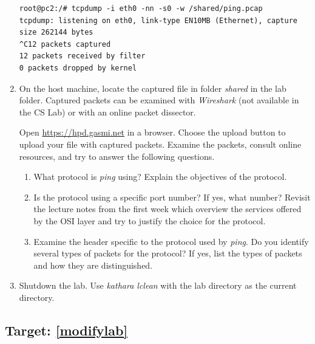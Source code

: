 \documentclass[12pt]{book}
\begin{document}
\begin{enumerate}[resume*]
  \medskip
  \begin{lstlisting}
root@pc2:/# tcpdump -i eth0 -nn -s0 -w /shared/ping.pcap
tcpdump: listening on eth0, link-type EN10MB (Ethernet), capture size 262144 bytes
^C12 packets captured
12 packets received by filter
0 packets dropped by kernel
  \end{lstlisting}

\item\label{icmp} On the host machine, locate the captured file in folder \emph{shared} in the lab folder. Captured packets can be examined with \emph{Wireshark} (not available in the CS Lab) or with an online packet dissector.

  Open \url{https://hpd.gasmi.net} in a browser. Choose the upload button to upload your file with captured packets. Examine the packets, consult online resources, and try to answer the following questions.
  \begin{enumerate}[label=\roman*)]
  \item What protocol is \emph{ping} using? Explain the objectives of the protocol.
  \item Is the protocol using a specific port number? If yes, what number? Revisit the lecture notes from the first week which overview the services offered by the OSI layer and try to justify the choice for the protocol.
  \item Examine the header specific to the protocol used by \emph{ping}. Do you identify several types of packets for the protocol? If yes, list the types of packets and how they are distinguished.
  \end{enumerate}

\item Shutdown the lab. Use \emph{kathara lclean} with the lab directory as the current directory.

\end{enumerate}

\subsection{Target: \ref{modifylab}}
\end{document}
